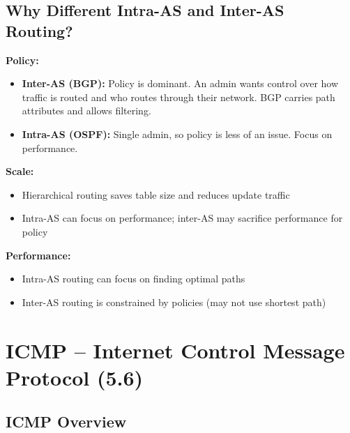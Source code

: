 \subsection{Why Different Intra-AS and Inter-AS Routing?}

\begin{keybox}
\textbf{Policy:}
\begin{itemize}[noitemsep]
    \item \textbf{Inter-AS (BGP):} Policy is dominant. An admin wants control over how traffic is routed and who routes through their network. BGP carries path attributes and allows filtering.
    \item \textbf{Intra-AS (OSPF):} Single admin, so policy is less of an issue. Focus on performance.
\end{itemize}

\textbf{Scale:}
\begin{itemize}[noitemsep]
    \item Hierarchical routing saves table size and reduces update traffic
    \item Intra-AS can focus on performance; inter-AS may sacrifice performance for policy
\end{itemize}

\textbf{Performance:}
\begin{itemize}[noitemsep]
    \item Intra-AS routing can focus on finding optimal paths
    \item Inter-AS routing is constrained by policies (may not use shortest path)
\end{itemize}
\end{keybox}

\section{ICMP -- Internet Control Message Protocol (5.6)}

\subsection{ICMP Overview}

